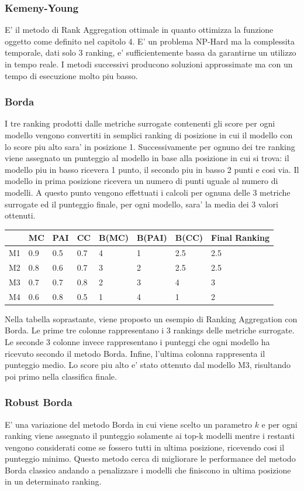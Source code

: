 \subsubsection{Kemeny-Young}
E' il metodo di Rank Aggregation ottimale in quanto ottimizza la funzione oggetto come definito nel capitolo 4. E' un problema NP-Hard ma la complessita temporale, dati solo 3 ranking, e' sufficientemente bassa da garantirne un utilizzo in tempo reale. I metodi successivi producono soluzioni approssimate ma con un tempo di esecuzione molto piu basso.
\subsubsection{Borda}
I tre ranking prodotti dalle metriche surrogate contenenti gli score per ogni modello vengono convertiti in semplici ranking di posizione in cui il modello con lo score piu alto sara' in posizione 1. Successivamente per ognuno dei tre ranking viene assegnato un punteggio al modello in base alla posizione in cui si trova: il modello piu in basso ricevera 1 punto, il secondo piu in basso 2 punti e cosi via. Il modello in prima posizione ricevera un numero di punti uguale al numero di modelli. A questo punto vengono effettuati i calcoli per ognuna delle 3 metriche surrogate ed il punteggio finale, per ogni modello, sara' la media dei 3 valori ottenuti.


\begin{tabular}{|l|l|l|l|l|l|l|l|}
\hline
   & MC  & PAI & CC  & B(MC) & B(PAI) & B(CC) & Final Ranking \\ \hline
M1 & 0.9 & 0.5 & 0.7 & 4     & 1      & 2.5   & 2.5           \\ \hline
M2 & 0.8 & 0.6 & 0.7 & 3     & 2      & 2.5   & 2.5           \\ \hline
M3 & 0.7 & 0.7 & 0.8 & 2     & 3      & 4     & 3             \\ \hline
M4 & 0.6 & 0.8 & 0.5 & 1     & 4      & 1     & 2             \\ \hline
\end{tabular}


Nella tabella soprastante, viene proposto un esempio di Ranking Aggregation con Borda. Le prime tre colonne rappresentano i 3 rankings delle metriche surrogate. Le seconde 3 colonne invece rappresentano i punteggi che ogni modello ha ricevuto secondo il metodo Borda. Infine, l'ultima colonna rappresenta il punteggio medio. Lo score piu alto e' stato ottenuto dal modello M3, risultando poi primo nella classifica finale.
\subsubsection{Robust Borda}
E' una variazione del metodo Borda in cui viene scelto un parametro $k$ e per ogni ranking viene assegnato il punteggio solamente ai top-k modelli mentre i restanti vengono considerati come se fossero tutti in ultima posizione, ricevendo cosi il punteggio minimo. Questo metodo cerca di migliorare le performance del metodo Borda classico andando a penalizzare i modelli che finiscono in ultima posizione in un determinato ranking.


